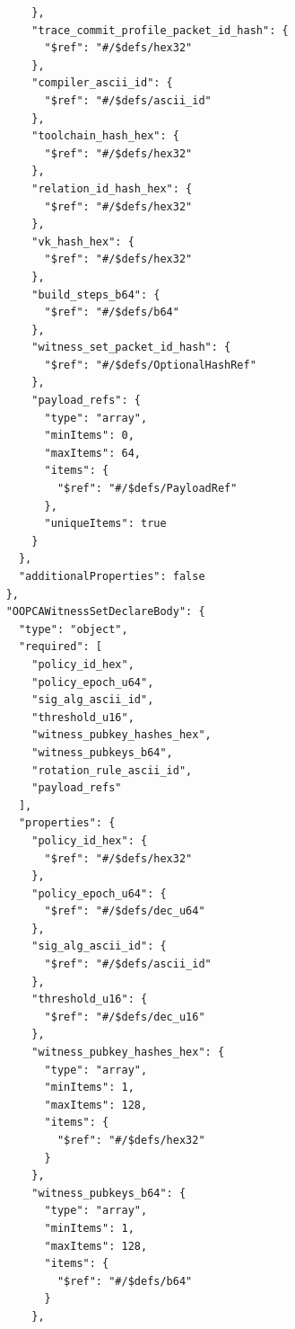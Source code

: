 \documentclass[11pt]{article}
\begin{document}
\begin{lstlisting}
        },
        "trace_commit_profile_packet_id_hash": {
          "$ref": "#/$defs/hex32"
        },
        "compiler_ascii_id": {
          "$ref": "#/$defs/ascii_id"
        },
        "toolchain_hash_hex": {
          "$ref": "#/$defs/hex32"
        },
        "relation_id_hash_hex": {
          "$ref": "#/$defs/hex32"
        },
        "vk_hash_hex": {
          "$ref": "#/$defs/hex32"
        },
        "build_steps_b64": {
          "$ref": "#/$defs/b64"
        },
        "witness_set_packet_id_hash": {
          "$ref": "#/$defs/OptionalHashRef"
        },
        "payload_refs": {
          "type": "array",
          "minItems": 0,
          "maxItems": 64,
          "items": {
            "$ref": "#/$defs/PayloadRef"
          },
          "uniqueItems": true
        }
      },
      "additionalProperties": false
    },
    "OOPCAWitnessSetDeclareBody": {
      "type": "object",
      "required": [
        "policy_id_hex",
        "policy_epoch_u64",
        "sig_alg_ascii_id",
        "threshold_u16",
        "witness_pubkey_hashes_hex",
        "witness_pubkeys_b64",
        "rotation_rule_ascii_id",
        "payload_refs"
      ],
      "properties": {
        "policy_id_hex": {
          "$ref": "#/$defs/hex32"
        },
        "policy_epoch_u64": {
          "$ref": "#/$defs/dec_u64"
        },
        "sig_alg_ascii_id": {
          "$ref": "#/$defs/ascii_id"
        },
        "threshold_u16": {
          "$ref": "#/$defs/dec_u16"
        },
        "witness_pubkey_hashes_hex": {
          "type": "array",
          "minItems": 1,
          "maxItems": 128,
          "items": {
            "$ref": "#/$defs/hex32"
          }
        },
        "witness_pubkeys_b64": {
          "type": "array",
          "minItems": 1,
          "maxItems": 128,
          "items": {
            "$ref": "#/$defs/b64"
          }
        },


\end{lstlisting}
\end{document}
